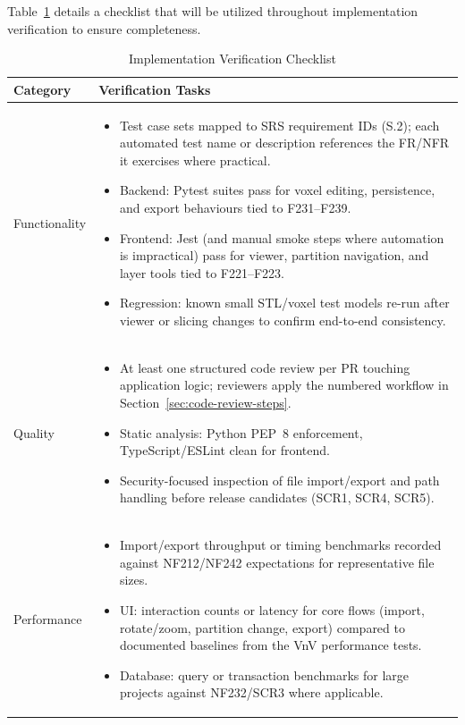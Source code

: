 \documentclass[12pt, titlepage]{article}
\begin{document}
\noindent Table~\ref{tab:impl} details a checklist that will be utilized throughout implementation verification to ensure completeness.\\

\begin{table}[H]
\centering
\caption{Implementation Verification Checklist}
\label{tab:impl}
\renewcommand{\arraystretch}{1.3}
\setlength{\tabcolsep}{8pt}
\begin{tabular}{|p{}|p{}|}
\hline
\textbf{Category} & \textbf{Verification Tasks} \\ \hline
Functionality &
\begin{itemize}
\item Test case sets mapped to SRS requirement IDs (S.2); each automated test name or description references the FR/NFR it exercises where practical.
\item Backend: Pytest suites pass for voxel editing, persistence, and export behaviours tied to F231--F239.
\item Frontend: Jest (and manual smoke steps where automation is impractical) pass for viewer, partition navigation, and layer tools tied to F221--F223.
\item Regression: known small STL/voxel test models re-run after viewer or slicing changes to confirm end-to-end consistency.
\end{itemize} \\ \hline
Quality &
\begin{itemize}
\item At least one structured code review per PR touching application logic; reviewers apply the numbered workflow in Section~\ref{sec:code-review-steps}.
\item Static analysis: Python PEP~8 enforcement, TypeScript/ESLint clean for frontend.
\item Security-focused inspection of file import/export and path handling before release candidates (SCR1, SCR4, SCR5).
\end{itemize} \\ \hline
Performance &
\begin{itemize}
\item Import/export throughput or timing benchmarks recorded against NF212/NF242 expectations for representative file sizes.
\item UI: interaction counts or latency for core flows (import, rotate/zoom, partition change, export) compared to documented baselines from the VnV performance tests.
\item Database: query or transaction benchmarks for large projects against NF232/SCR3 where applicable.

\end{itemize}
\end{tabular}
\end{table}
\end{document}
